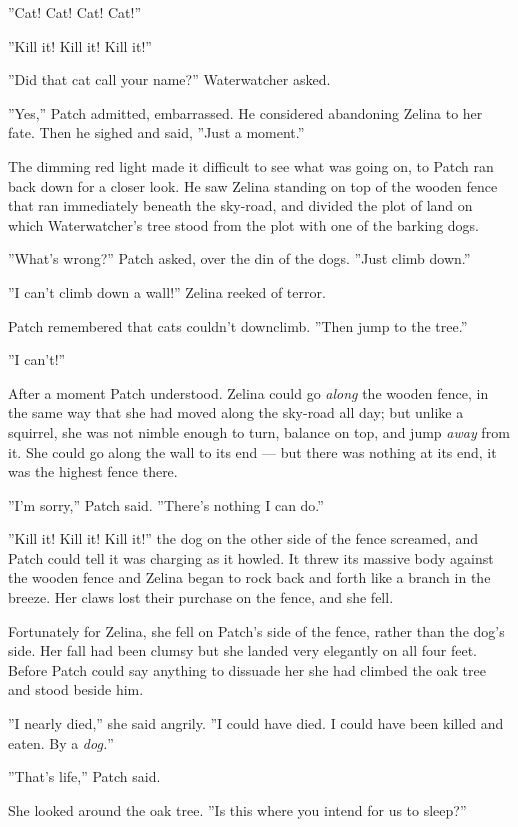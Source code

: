 \documentclass[12pt]{book}
\begin{document}
''Cat! Cat! Cat! Cat!''

''Kill it! Kill it! Kill it!''

''Did that cat call your name?'' Waterwatcher asked.

''Yes,'' Patch admitted, embarrassed. He considered abandoning Zelina
to her fate. Then he sighed and said, ''Just a moment.''

The dimming red light made it difficult to see what was going on, to
Patch ran back down for a closer look. He saw Zelina standing on top
of the wooden fence that ran immediately beneath the sky-road, and
divided the plot of land on which Waterwatcher's tree stood from the
plot with one of the barking dogs.

''What's wrong?'' Patch asked, over the din of the dogs. ''Just climb
down.''

''I can't climb down a wall!'' Zelina reeked of terror.

Patch remembered that cats couldn't downclimb. ''Then jump to the
tree.''

''I can't!''

After a moment Patch understood. Zelina could go \textit{along} the
wooden fence, in the same way that she had moved along the sky-road
all day; but unlike a squirrel, she was not nimble enough to turn,
balance on top, and jump \textit{away} from it. She could go along the
wall to its end --- but there was nothing at its end, it was the
highest fence there.

''I'm sorry,'' Patch said. ''There's nothing I can do.''

''Kill it! Kill it! Kill it!'' the dog on the other side of the fence
screamed, and Patch could tell it was charging as it howled. It threw
its massive body against the wooden fence and Zelina began to rock
back and forth like a branch in the breeze. Her claws lost their
purchase on the fence, and she fell.

Fortunately for Zelina, she fell on Patch's side of the fence, rather
than the dog's side. Her fall had been clumsy but she landed very
elegantly on all four feet. Before Patch could say anything to
dissuade her she had climbed the oak tree and stood beside him.

''I nearly died,'' she said angrily. ''I could have died. I could have
been killed and eaten. By a \textit{dog.}''

''That's life,'' Patch said.

She looked around the oak tree. ''Is this where you intend for us to
sleep?''
\end{document}
